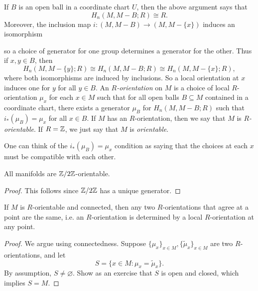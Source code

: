 \begin{definition}
  If $B$ is an open ball in a coordinate
  chart $U$, then the above argument says that
  \[
    H_n(M, M - B; R)
    \cong R.
  \]
  Moreover, the inclusion map
  $i : (M, M - B) \to (M, M - \{x\})$
  induces an isomorphism
  \begin{center}
  \end{center}
  so a choice of generator for one group
  determines a generator for the other. Thus if
  $x, y \in B$, then
  \[
    H_n(M, M - \{y\}; R)
    \cong H_n(M, M - B; R)
    \cong H_n(M, M - \{x\}; R),
  \]
  where both isomorphisms are induced by
  inclusions. So a local orientation at $x$
  induces one for $y$ for all $y \in B$.
  An \emph{$R$-orientation} on $M$ is a choice
  of local $R$-orientation $\mu_x$ for
  each $x \in M$ such that for all open balls
  $B \subseteq M$ contained in a coordinate
  chart, there exists a generator $\mu_B$ for
  $H_n(M, M - B; R)$ such that
  $i_*(\mu_B) = \mu_x$ for all $x \in B$.
  If $M$ has an $R$-orientation, then we
  say that $M$ is \emph{$R$-orientable}.
  If $R = \mathbb{Z}$, we just say that $M$ is
  \emph{orientable}.
\end{definition}

\begin{remark}
  One can think of the $i_*(\mu_B) = \mu_x$
  condition as saying that the choices
  at each $x$ must be compatible with each
  other.
\end{remark}

\begin{lemma}
  All manifolds are $\mathbb{Z} / 2\mathbb{Z}$-orientable.
\end{lemma}

\begin{proof}
  This follows since
  $\mathbb{Z} / 2\mathbb{Z}$ has a unique generator.
\end{proof}

\begin{lemma}
  If $M$ is $R$-orientable and connected,
  then any two $R$-orientations that
  agree at a point are the same, i.e. an
  $R$-orientation is determined by a local
  $R$-orientation at any point.
\end{lemma}

\begin{proof}
  We argue using connectedness.
  Suppose $\{\mu_x\}_{x \in M}, \{\widetilde{\mu}_x\}_{x \in M}$
  are two $R$-orientations, and let
  \[
    S = \{x \in M : \mu_x = \widetilde{\mu}_x\}.
  \]
  By assumption, $S \ne \varnothing$.
  Show as an exercise that $S$ is open and
  closed, which implies $S = M$.
\end{proof}

